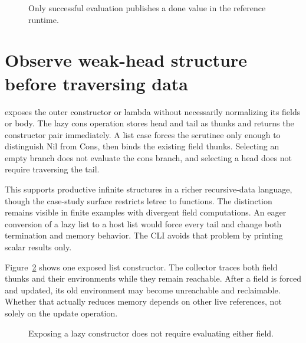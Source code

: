 \begin{figure}[htbp]
\centering
{}
\caption{Only successful evaluation publishes a done value in the reference runtime.}
\label{fig:ch92-states}
\end{figure}

\section{Observe weak-head structure before traversing data}
\label{sec:ch92-whnf}
 exposes the outer constructor or lambda without necessarily normalizing its fields or body.
The lazy cons operation stores head and tail as thunks and returns the constructor pair immediately.
A list case forces the scrutinee only enough to distinguish Nil from Cons, then binds the existing field thunks.
Selecting an empty branch does not evaluate the cons branch, and selecting a head does not require traversing the tail.

This supports productive infinite structures in a richer recursive-data language, though the case-study surface restricts letrec to functions.
The distinction remains visible in finite examples with divergent field computations.
An eager conversion of a lazy list to a host list would force every tail and change both termination and memory behavior.
The CLI avoids that problem by printing scalar results only.

Figure~\ref{fig:ch92-list} shows one exposed list constructor.
The collector traces both field thunks and their environments while they remain reachable.
After a field is forced and updated, its old environment may become unreachable and reclaimable.
Whether that actually reduces memory depends on other live references, not solely on the update operation.

\begin{figure}[htbp]
\centering
{}
\caption{Exposing a lazy constructor does not require evaluating either field.}
\label{fig:ch92-list}
\end{figure}

